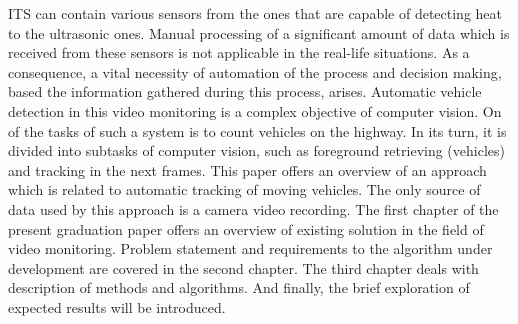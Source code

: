 \documentclass[12pt,a4paper,oneside,titlepage]{article}
\begin{document}
ITS can contain various sensors from the ones that are capable of detecting heat to the ultrasonic ones.
Manual processing of a significant amount of data which is received from these sensors is not applicable in the real-life situations.
As a consequence, a vital necessity of automation of the process and decision making, based the information gathered during this process, arises.
Automatic vehicle detection in this video monitoring is a complex objective of computer vision.
On of the tasks of such a system is to count vehicles on the highway.
In its turn, it is divided into subtasks of computer vision, such as foreground retrieving (vehicles) and tracking in the next frames.
This paper offers an overview of an approach which is related to automatic tracking of moving vehicles.
The only source of data used by this approach is a camera video recording.
The first chapter of the present graduation paper offers an overview of existing solution in the field of video monitoring.
Problem statement and requirements to the algorithm under development are covered in the second chapter.
The third chapter deals with description of methods and algorithms.
And finally, the brief exploration of expected results will be introduced.
\end{document}
